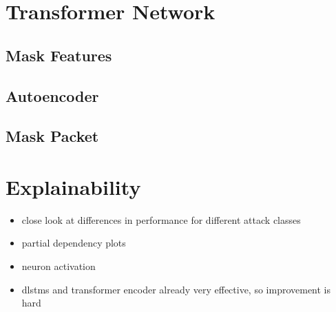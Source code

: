 \section{Transformer Network}

\subsection{Mask Features} \label{sec:results:transformer:mask_features}

\subsection{Autoencoder} \label{sec:results:transformer:autoencoder}

\subsection{Mask Packet} \label{sec:results:transformer:mask_packet}

\section{Explainability}

\begin{itemize}
	\item close look at differences in performance for different attack classes
	\item partial dependency plots
	\item neuron activation
	\item \gls{dlstm}s and transformer encoder already very effective, so improvement is hard
\end{itemize}

\newpage
